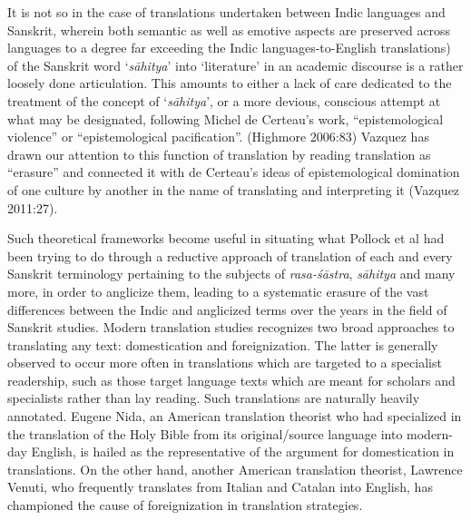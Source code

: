 It is not so in the case of translations undertaken between Indic languages and Sanskrit, wherein both semantic as well as emotive aspects are preserved across languages to a degree far exceeding the Indic languages-to-English translations) of the Sanskrit word ‘\textsl{sāhitya}’ into ‘literature’ in an academic discourse is a rather loosely done articulation. This amounts to either a lack of care dedicated to the treatment of the concept of ‘\textsl{sāhitya}’, or a more devious, conscious attempt at what may be designated, following Michel de Certeau’s work, “epistemological violence” or “epistemological pacification”. (Highmore 2006:83) Vazquez has drawn our attention to this function of translation by reading translation as “erasure” and connected it with de Certeau’s ideas of epistemological domination of one culture by another in the name of translating and interpreting it (Vazquez 2011:27). 

Such theoretical frameworks become useful in situating what Pollock et al had been trying to do through a reductive approach of translation of each and every Sanskrit terminology pertaining to the subjects of \textsl{rasa-śāstra}, \textsl{sāhitya} and many more, in order to anglicize them, leading to a systematic erasure of the vast differences between the Indic and anglicized terms over the years in the field of Sanskrit studies. Modern translation studies recognizes two broad approaches to translating any text: domestication and foreignization. The latter is generally observed to occur more often in translations which are targeted to a specialist readership, such as those target language texts which are meant for scholars and specialists rather than lay reading. Such translations are naturally heavily annotated. Eugene Nida, an American translation theorist who had specialized in the translation of the Holy Bible from its original/source language into modern-day English, is hailed as the representative of the argument for domestication in translations. On the other hand, another American translation theorist, Lawrence Venuti, who frequently translates from Italian and Catalan into English, has championed the cause of foreignization in translation strategies. 

